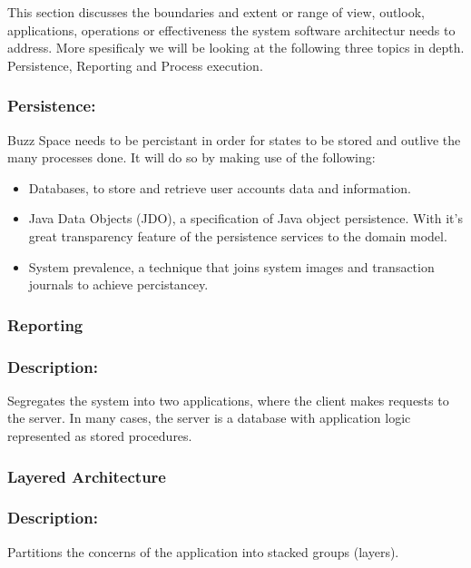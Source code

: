This section discusses the boundaries and extent or range of view, outlook, applications, operations or effectiveness the system software architectur needs to address. 
More spesificaly we will be looking at the following three topics in depth. Persistence, Reporting and Process execution.

\subsubsection{Persistence:}
	Buzz Space needs to be percistant in order for states to be stored and outlive the many
	processes done. It will do so by making use of the following:

		\begin{itemize}
			\item Databases, to store and retrieve user accounts data and information.
			\item Java Data Objects (JDO), a specification of Java object persistence. With it's great
			 transparency feature of the persistence services to the domain model.
			\item System prevalence, a technique that joins system images and transaction journals to achieve percistancey.
		\end{itemize}
	
	
	\subsubsection{Reporting}
	\subsubsection*{Description:}
		Segregates the system into two applications, where the client makes requests to the server. In many cases, the server is a database with application logic represented as stored procedures.
			
			
				\subsubsection{Layered Architecture}
				\subsubsection*{Description:}
				Partitions the concerns of the application into stacked groups (layers).
						
